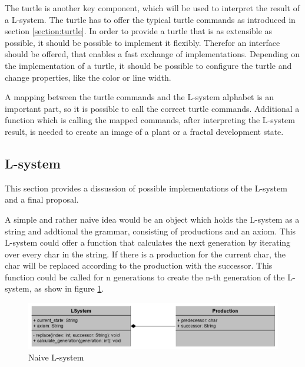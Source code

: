 \documentclass[english]{cpp-hmwk}
\begin{document}
\medskip

\noindent The turtle is another key component, which will be used to interpret the result of a L-system. The turtle has to offer the typical turtle commands as introduced in section \ref{section:turtle}. In order to provide a turtle that is as extensible as possible, it should be possible to implement it flexibly. Therefor an interface should be offered, that enables a fast exchange of implementations. Depending on the implementation of a turtle, it should be possible to configure the turtle and change properties, like the color or line width.

\medskip
\noindent A mapping between the turtle commands and the L-system alphabet is an important part, so it is possible to call the correct turtle commands. Additional a function which is calling the mapped commands, after interpreting the L-system result, is needed to create an image of a plant or a fractal development state.


\subsection{L-system}
This section provides a dissussion of possible implementations of the L-system and a final proposal.

\medskip

\noindent A simple and rather naive idea would be an object which holds the L-system as a string and addtional the grammar, consisting of productions and an axiom. This L-system could offer a function that calculates the next generation by iterating over every char in the string. If there is a production for the current char, the char will be replaced according to the production with the successor. This function could be called for n generations to create the n-th generation of the L-system, as show in figure \ref{figure:naive_lsystem}.

\begin{figure}[h!]
	\centering
	\includegraphics[width=1\columnwidth]{../graphs/LSystem/naive/class_diagram_l_system_naive.png}
	\caption{Naive L-system}
	\label{figure:naive_lsystem}
\end{figure}
\end{document}
